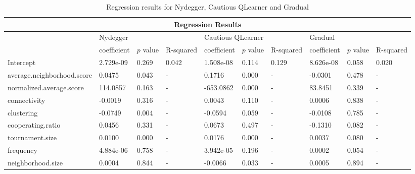 \begin{table}[!hbtp]
	\centering
	\begin{adjustbox}{width=0.7\textwidth}
		\small
		\begin{tabular}{|l|l|l|l|l|l|l|l|l|l|}
			\hline
			\multicolumn{10}{|c|}{Regression Results}                                                                       \\ \hline
			& \multicolumn{3}{l|}{Nydegger} & \multicolumn{3}{l|}{Cautious QLearner} & \multicolumn{3}{l|}{Gradual} \\ \hline
			  & coefficient & \(p\) value & R-squared & coefficient & \(p\) value & R-squared & coefficient & \(p\) value & R-squared    \\ \hline

			Intercept                  &  2.729e-09   & 0.269    & 0.042 		& 1.508e-08  &    0.114   & 0.129		& 8.626e-08   &  0.058 &  0.020       \\ \hline
			average.neighborhood.score &     0.0475   & 0.043    & - 				&    0.1716  &    0.000   & -  			&   -0.0301   &  0.478 &  -					\\ \hline
			normalized.average.score   &   114.0857   & 0.163    & - 				& -653.0862  &    0.000   & - 			&   83.8451   &  0.339 &  -						\\ \hline
			connectivity               &    -0.0019   & 0.316    & - 				&    0.0043  &    0.110   & - 		 	&    0.0006   &  0.838 &  -  					\\ \hline
			clustering                 &    -0.0749   & 0.004    & - 				&   -0.0594  &    0.059   & -  			&   -0.0108   &  0.785 & 	-					\\ \hline
			cooperating.ratio          &     0.0456   & 0.331    & - 				&    0.0673  &    0.497   & - 			&   -0.1310   &  0.082 &  -						\\ \hline
			tournament.size            &     0.0100   & 0.000    & - 				&    0.0176  &    0.000   & - 		  &    0.0037   &  0.080 & 	-						\\ \hline
			frequency                  &  4.884e-06   & 0.758    & -  			& 3.942e-05  &    0.196   & - 			&    0.0002   &  0.054 &  -		 			\\ \hline
			neighborhood.size          &     0.0004   & 0.844    & - 				&   -0.0066  &    0.033   & -  			&    0.0005   &  0.894 &  -						\\ \hline

		\end{tabular}
	\end{adjustbox}
	\caption{Regression results for Nydegger, Cautious QLearner and Gradual}
	\label{reg-for-top}
\end{table}

